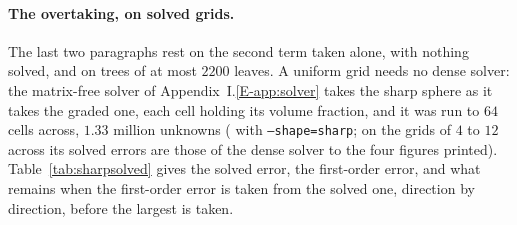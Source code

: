 \documentclass[11pt,a4paper]{article}
\begin{document}
\paragraph{The overtaking, on solved grids.} The last two paragraphs rest on the second term taken alone,
with nothing solved, and on trees of at most $2200$ leaves. A uniform grid needs no dense solver: the
matrix-free solver of Appendix~I.\ref{E-app:solver} takes the sharp sphere as it takes the graded one, each
cell holding its volume fraction, and it was run to $64$ cells across, $1.33$ million unknowns
( with \texttt{--shape=sharp}; on the grids of $4$ to $12$ across
its solved errors are those of the dense solver to the four figures printed). Table~\ref{tab:sharpsolved}
gives the solved error, the first-order error, and what remains when the first-order error is taken from
the solved one, direction by direction, before the largest is taken.
\end{document}
